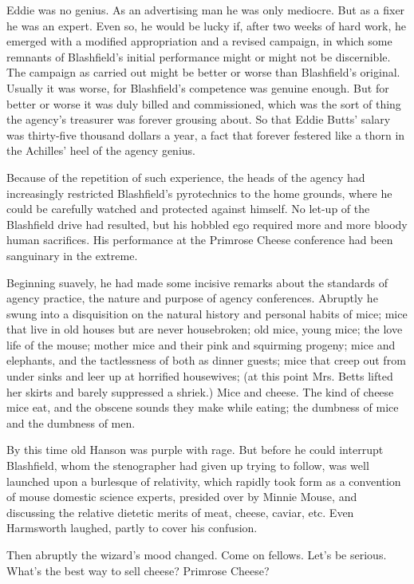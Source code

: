 \documentclass[twoside,nohyper,openany,nobib]{tufte-book}
\begin{document}
Eddie was no genius. As an advertising man he was only mediocre. But as
a fixer he was an expert. Even so, he would be lucky if, after two weeks
of hard work, he emerged with a modified appropriation and a revised
campaign, in which some remnants of Blashfield's initial performance
might or might not be discernible. The campaign as carried out might be
better or worse than Blashfield's original. Usually it was worse, for
Blashfield's competence was genuine enough. But for better or worse it
was duly billed and commissioned, which was the sort of thing the
agency's treasurer was forever grousing about. So that Eddie Butts'
salary was thirty-five thousand dollars a year, a fact that forever
festered like a thorn in the Achilles' heel of the agency genius.

Because of the repetition of such experience, the heads of the agency
had increasingly restricted Blashfield's pyrotechnics to the home
grounds, where he could be carefully watched and protected against
himself. No let-up of the Blashfield drive had resulted, but his hobbled
ego required more and more bloody human sacrifices. His performance at
the Primrose Cheese conference had been sanguinary in the extreme.

Beginning suavely, he had made some incisive remarks about the standards
of agency practice, the nature and purpose of agency conferences.
Abruptly he swung into a disquisition on the natural history and
personal habits of mice; mice that live in old houses but are never
housebroken; old mice, young mice; the love life of the mouse; mother
mice and their pink and squirming progeny; mice and elephants, and the
tactlessness of both as dinner guests; mice that creep out from under
sinks and leer up at horrified housewives; (at this point Mrs. Betts
lifted her skirts and barely suppressed a shriek.) Mice and cheese. The
kind of cheese mice eat, and the obscene sounds they make while eating;
the dumbness of mice and the dumbness of men.

By this time old Hanson was purple with rage. But before he could
interrupt Blashfield, whom the stenographer had given up trying to
follow, was well launched upon a burlesque of relativity, which rapidly
took form as a convention of mouse domestic science experts, presided
over by Minnie Mouse, and discussing the relative dietetic merits of
meat, cheese, caviar, etc. Even Harmsworth laughed, partly to cover his
confusion.

Then abruptly the wizard's mood changed. Come on fellows. Let's be
serious. What's the best way to sell cheese? Primrose Cheese?
\end{document}
